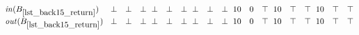 \begin{math}
\begin{array}{@{}l@{\phantom{X}}ccc@{\hskip0.6em}ccc@{\hskip0.6em}ccc@{\hskip0.6em}ccc@{\hskip0.6em}ccc@{\hskip0.6em}ccc@{}}
    \inB{lst_back15_return} & %
    \bot & \bot & \bot & %
    \bot & \bot & \bot & %
    \bot & \bot & \bot & %
    10 & 0 & \top & %
    10 & \top & \top & %
    10 & \top & \top \\ %
    \outB{lst_back15_return} & %
    \bot & \bot & \bot & %
    \bot & \bot & \bot & %
    \bot & \bot & \bot & %
    10 & 0 & \top & %
    10 & \top & \top & %
    10 & \top & \top \\\\ %
  \end{array}
\end{math}

